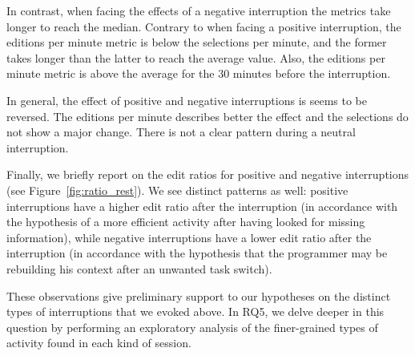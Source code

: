 \documentclass[times]{smrauth}
\begin{document}
In contrast, when facing the effects of a negative interruption the metrics take longer to reach the median. Contrary to when facing a positive interruption, the editions per minute metric is below the selections per minute, and the former takes longer than the latter to reach the average value. Also, the editions per minute metric is above the average for the 30 minutes before the interruption. 

In general, the effect of positive and negative interruptions is seems to be reversed. The editions per minute describes better the effect and the selections do not show a major change. There is not a clear pattern during a neutral interruption.

Finally, we briefly report on the edit ratios for positive and negative interruptions (see Figure~\ref{fig:ratio_rest}). We see distinct patterns as well: positive interruptions have a higher edit ratio after the interruption (in accordance with the hypothesis of a more efficient activity after having looked for missing information), while negative interruptions have a lower edit ratio after the interruption (in accordance with the hypothesis that the programmer may be rebuilding his context after an unwanted task switch).

These observations give preliminary support to our hypotheses on the distinct types of interruptions that we evoked above. In RQ5, we delve deeper in this question by performing an exploratory analysis of the finer-grained types of activity found in each kind of session.
\end{document}
